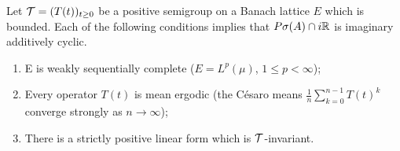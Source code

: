 \begin{corollary}\label{cor:c3-4.3}
	Let $\mathcal{T} = (T(t))_{t \geq 0}$ be a positive semigroup on a Banach lattice $E$ which is bounded. 
	Each of the following conditions implies that $P\sigma(A)\cap i\mathbb{R} $ is imaginary additively cyclic.
	\begin{enumerate}[\upshape (i)]
		\item E is weakly sequentially complete (\eg $E = L^{p}(\mu)$, $1 \leq p < \infty$);
		\item Every operator $T(t)$ is mean ergodic (\ie the Césaro means $\frac{1}{n}\sum_{k=0}^{n-1}T(t)^{k}$ converge strongly as $n \to  \infty$);
		\item There is a strictly positive linear form which is $\mathcal{T}$-invariant.
	\end{enumerate}
\end{corollary}
